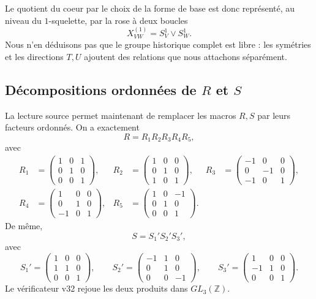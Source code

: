 \documentclass[11pt,a4paper]{article}
\begin{document}
Le quotient du coeur par le choix de la forme de base est donc représenté, au niveau du
$1$-squelette, par la rose à deux boucles
\[
 \boxed{X_{VW}^{(1)}=S^1_V\vee S^1_W.}
\]
Nous n'en déduisons pas que le groupe historique complet est libre : les symétries et les directions
$T,U$ ajoutent des relations que nous attachons séparément.

\subsection{Décompositions ordonnées de $R$ et $S$}

La lecture source permet maintenant de remplacer les macros $R,S$ par leurs facteurs ordonnés.
On a exactement
\begin{equation}\label{eq:v32-R-factor-source}
 R=R_1R_2R_3R_4R_5,
\end{equation}
avec
\[
\begin{aligned}
R_1&=\begin{pmatrix}1&0&1\\0&1&0\\0&0&1\end{pmatrix},&
R_2&=\begin{pmatrix}1&0&0\\0&1&0\\1&0&1\end{pmatrix},&
R_3&=\begin{pmatrix}-1&0&0\\0&-1&0\\-1&0&1\end{pmatrix},\\[1mm]
R_4&=\begin{pmatrix}1&0&0\\0&1&0\\-1&0&1\end{pmatrix},&
R_5&=\begin{pmatrix}1&0&-1\\0&1&0\\0&0&1\end{pmatrix}.
\end{aligned}
\]
De même,
\begin{equation}\label{eq:v32-S-factor-source}
 S=S_1'S_2'S_3',
\end{equation}
avec
\[
 S_1'=\begin{pmatrix}1&0&0\\1&1&0\\0&0&1\end{pmatrix},\qquad
 S_2'=\begin{pmatrix}-1&1&0\\0&1&0\\0&0&-1\end{pmatrix},\qquad
 S_3'=\begin{pmatrix}1&0&0\\-1&1&0\\0&0&1\end{pmatrix}.
\]
Le vérificateur v32 rejoue les deux produits dans $GL_3(\mathbb Z)$.
\end{document}
